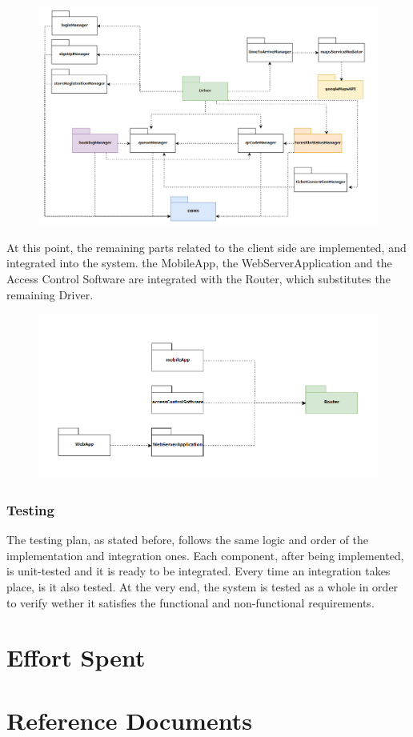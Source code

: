\documentclass{article}
\begin{document}
\smallskip\\
\begin{figure}[H]
  \includegraphics[width=\linewidth]{INTEGR4.png}
  
\end{figure}
At this point, the remaining parts related to the client side are implemented, and integrated into the system. the MobileApp, the WebServerApplication and the Access Control Software are integrated with the Router, which substitutes the remaining Driver.\\
\begin{figure}[H]
  \includegraphics[width=\linewidth]{INTEGR5.png}
  
\end{figure}
\subsubsection{Testing}

The testing plan, as stated before, follows the same logic and order of the implementation and integration ones. Each component, after being implemented, is unit-tested and it is ready to be integrated. Every time an integration takes place, is it also tested. At the very end, the system is tested as a whole in order to verify wether it satisfies the functional and non-functional requirements.

\section{Effort Spent}

\section{Reference Documents}
\end{document}
